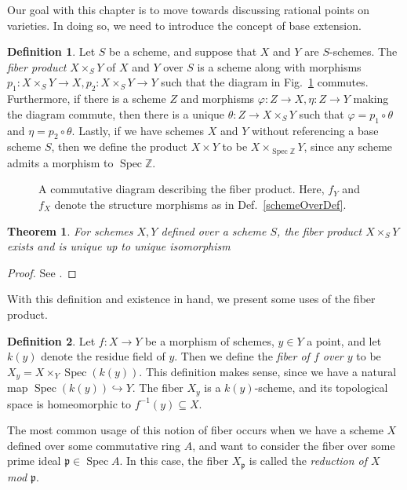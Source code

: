 \documentclass[12pt,twoside]{reedthesis}
\theoremstyle{plain}
\newtheorem{theorem}{Theorem}[chapter]
\theoremstyle{definition}
\newtheorem{definition}{Definition}[section]
\theoremstyle{remark}
\newcommand{\ZZ}{\mathbb{Z}}
\newcommand{\Spec}{\operatorname{Spec}}
\begin{document}
Our goal with this chapter is to move towards discussing rational points on varieties. In doing so, we need to introduce the concept of base extension.
\begin{definition}
Let $S$ be a scheme, and suppose that $X$ and $Y$ are $S$-schemes. The \emph{fiber product} $X\times_S Y$ of $X$ and $Y$ over $S$ is a scheme along with morphisms $p_1:X\times_S Y\to X, p_2:X\times_S Y\to Y$ such that the diagram in Fig.~\ref{fibDiag} commutes. Furthermore, if there is a scheme $Z$ and morphisms $\varphi:Z\to X, \eta:Z\to Y$ making the diagram commute, then there is a unique $\theta:Z\to X\times_S Y$ such that $\varphi=p_1\circ\theta$ and $\eta=p_2\circ\theta$. Lastly, if we have schemes $X$ and $Y$ without referencing a base scheme $S$, then we define the product $X\times Y$ to be $X\times_{\Spec\ZZ} Y$, since any scheme admits a morphism to $\Spec\ZZ$.
\begin{figure}[h]
\centering
{}
\caption{A commutative diagram describing the fiber product. Here, $f_Y$ and $f_X$ denote the structure morphisms as in Def.~\ref{schemeOverDef}.}
\label{fibDiag}
\end{figure}
\end{definition}
\begin{theorem}
For schemes $X,Y$ defined over a scheme $S$, the fiber product $X\times_S Y$ exists and is unique up to unique isomorphism
\end{theorem}
\begin{proof}
See \cite[Ch. II, Theorem 3.3]{hartshorne}.
\end{proof}
With this definition and existence in hand, we present some uses of the fiber product.
\begin{definition}
Let $f:X\to Y$ be a morphism of schemes, $y\in Y$ a point, and let $k(y)$ denote the residue field of $y$. Then we define the \emph{fiber of $f$ over $y$} to be $X_y=X\times_Y\Spec(k(y))$. This definition makes sense, since we have a natural map $\Spec(k(y))\hookrightarrow Y$. The fiber $X_y$ is a $k(y)$-scheme, and its topological space is homeomorphic to $f^{-1}(y)\subseteq X$.
\end{definition}
\noindent The most common usage of this notion of fiber occurs when we have a scheme $X$ defined over some commutative ring $A$, and want to consider the fiber over some prime ideal $\mathfrak{p}\in\Spec A$. In this case, the fiber $X_\mathfrak{p}$ is called the \emph{reduction of $X$ mod $\mathfrak{p}$}. 
\end{document}
